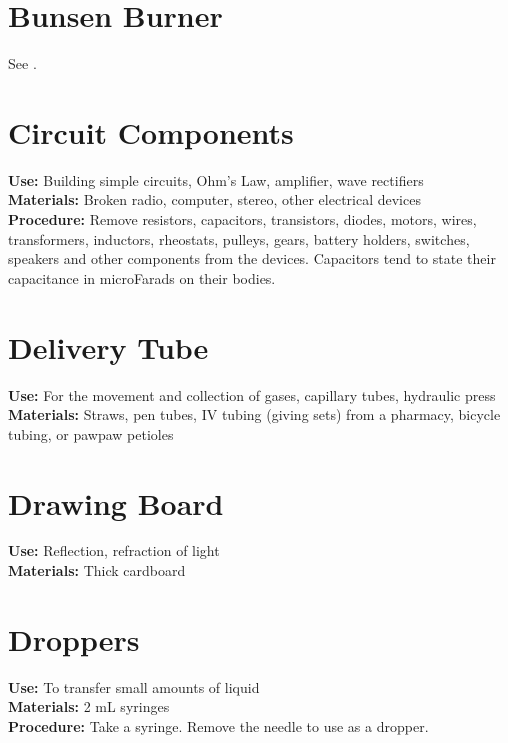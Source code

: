 \section*{Bunsen Burner}
\vspace{-10pt}
See .

\section*{Circuit Components}
\vspace{-10pt}
\textbf{Use:} Building simple circuits, Ohm's Law, amplifier, wave rectifiers\\
\textbf{Materials:} Broken radio, computer, stereo, other electrical devices\\
\textbf{Procedure:} Remove resistors, capacitors, transistors, diodes, motors, wires, transformers, inductors, rheostats, pulleys, gears, battery holders, switches, speakers and other components from the devices. Capacitors tend to state their capacitance in microFarads on their bodies.

\section*{Delivery Tube}
\label{sec:delivery-tube}
\vspace{-10pt}
\textbf{Use:} For the movement and collection of gases, capillary tubes, hydraulic press\\
\textbf{Materials:} Straws, pen tubes, IV tubing (giving sets) from a pharmacy, bicycle tubing, or pawpaw petioles

\section*{Drawing Board}
\vspace{-10pt}
\textbf{Use:} Reflection, refraction of light\\
\textbf{Materials:} Thick cardboard

\section*{Droppers}
\vspace{-10pt}
\textbf{Use:} To transfer small amounts of liquid \\
\textbf{Materials:} 2 mL syringes\\
\textbf{Procedure:} Take a syringe. Remove the needle to use as a dropper. 

